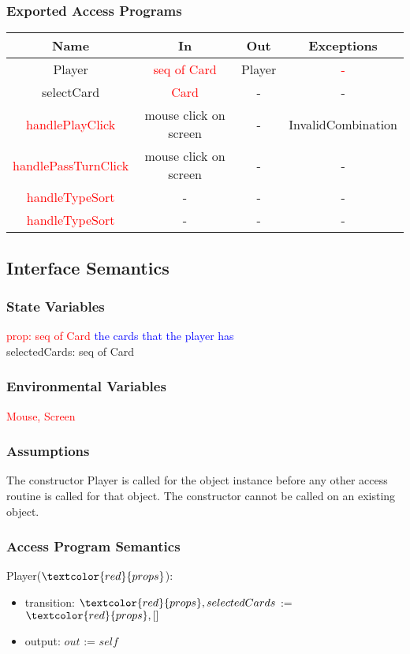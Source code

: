 \documentclass[12pt, titlepage]{article}
\begin{document}
\subsubsection{Exported Access Programs}
{\begin{tabular}[pos]{|c|c|c|c|}
\hline
\textbf{Name}& \textbf{In} & \textbf{Out} & \textbf{Exceptions} \\ \hline
Player & \textcolor{red}{seq of Card} & Player & \textcolor{red}{-}\\ 
\hline
selectCard & \textcolor{red}{Card} &- &- \\ 
\hline
\textcolor{red}{handlePlayClick} & mouse click on screen & - & InvalidCombination \\ 
\hline
\textcolor{red}{handlePassTurnClick} & mouse click on screen & - & - \\ 
\hline
\textcolor{red}{handleTypeSort} & - & - &- \\ 
\hline
\textcolor{red}{handleTypeSort} & - & - & - \\ 
\hline
\end{tabular}
}
\subsection{Interface Semantics}
\subsubsection{State Variables}
\textcolor{red}{prop: seq of Card} \textcolor{blue}{the cards that the player has}\\
selectedCards: seq of Card

\subsubsection{Environmental Variables}
\textcolor{red}{Mouse, Screen}

\subsubsection{Assumptions}
The constructor Player is called for the object instance before any other access routine is called for that object. The constructor cannot be called on an existing object.
\subsubsection{Access Program Semantics}
Player($\textcolor{red}{props}$):
\begin{itemize}
    \item transition: $\textcolor{red}{props}, selectedCards$ := $\textcolor{red}{props}, []$
    \item output: $out$ := $self$
\end{itemize}
\end{document}
